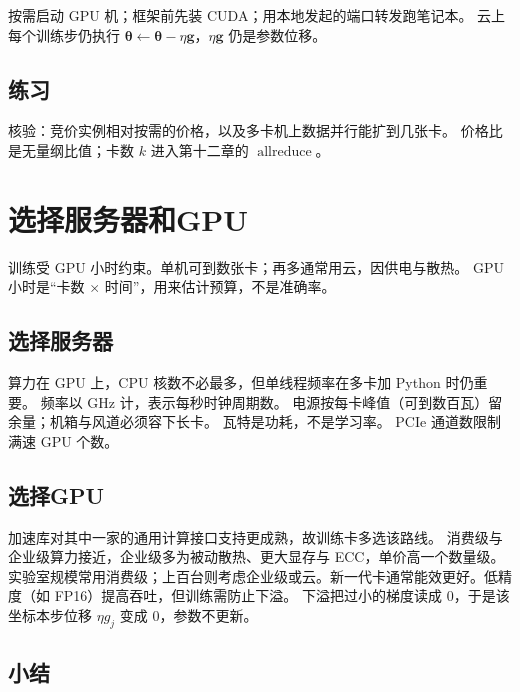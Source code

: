 按需启动 GPU 机；框架前先装 CUDA；用本地发起的端口转发跑笔记本。
云上每个训练步仍执行 $\bm{\theta}\leftarrow\bm{\theta}-\eta\bm{g}$，$\eta\bm{g}$ 仍是参数位移。

\subsection{练习}

核验：竞价实例相对按需的价格，以及多卡机上数据并行能扩到几张卡。
价格比是无量纲比值；卡数 $k$ 进入第十二章的 $\operatorname{allreduce}$。

\section{选择服务器和GPU}




训练受 GPU 小时约束。单机可到数张卡；再多通常用云，因供电与散热。
GPU 小时是“卡数 $\times$ 时间”，用来估计预算，不是准确率。

\subsection{选择服务器}

算力在 GPU 上，CPU 核数不必最多，但单线程频率在多卡加 Python 时仍重要。
频率以 GHz 计，表示每秒时钟周期数。
电源按每卡峰值（可到数百瓦）留余量；机箱与风道必须容下长卡。
瓦特是功耗，不是学习率。
PCIe 通道数限制满速 GPU 个数。

\subsection{选择GPU}

加速库对其中一家的通用计算接口支持更成熟，故训练卡多选该路线。
消费级与企业级算力接近，企业级多为被动散热、更大显存与 ECC，单价高一个数量级。
实验室规模常用消费级；上百台则考虑企业级或云。新一代卡通常能效更好。低精度（如 FP16）提高吞吐，但训练需防止下溢。
下溢把过小的梯度读成 $0$，于是该坐标本步位移 $\eta g_j$ 变成 $0$，参数不更新。

\subsection{小结}

